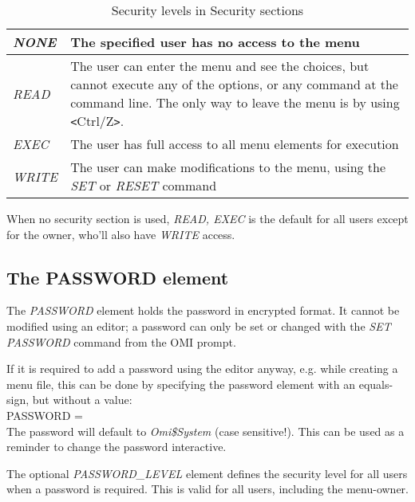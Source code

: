 \documentclass[a4paper]{book}
\newcommand{\vs}{\vspace{3mm}}
\newcommand{\lt}{\texttt{<}}
\newcommand{\gt}{\texttt{>}}
\renewcommand{\indent}{\hspace*{5mm}}
\begin{document}
\begin{table}[h!tb]
\begin{minipage}[h!tb]{\textwidth}
\begin{tabular}{lp{9cm}} \hline
\textsl{NONE} & The specified user has no access to the menu \\ \hline
\textsl{READ} & The user can enter the menu and see the choices, but cannot execute any of the options, or any command at the command line. The only way to leave the menu is by using \lt Ctrl/Z\gt . \\ \hline
\textsl{EXEC} &  The user has full access to all menu elements for execution \\ \hline
\textsl{WRITE} & The user can make modifications to the menu, using the \textsl{SET} or \textsl{RESET} command \\ \hline
\end{tabular}
\caption{Security levels in Security sections}\label{tab:seclevels}
\end{minipage}
\end{table}

When no security section is used, \textsl{READ, EXEC} is the default for all 
users except for the owner, who'll also have \textsl{WRITE} access.

\subsection{The PASSWORD element}
\label{subsubsec:mylabel33}

The \textsl{PASSWORD} element holds 
the password in encrypted format. It cannot be modified using an editor; a 
password can only be set or changed with the \textsl{SET PASSWORD} command from the OMI prompt.

\vs

If it is required to add a password using the editor anyway, e.g. while 
creating a menu file, this can be done by specifying the password element 
with an equals-sign, but without a value: \\
\indent\textsf{PASSWORD =}\\
The password will default to \textsl{Omi{\$}System} (case sensitive!). This can be 
used as a reminder to change the password interactive.

\vs

The optional \textsl{PASSWORD{\_}LEVEL} element defines the security level for all 
users when a password is required. This is valid for all users, including 
the menu-owner.
\end{document}
